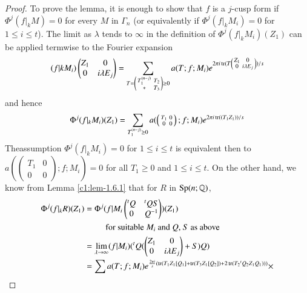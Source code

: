 \begin{proof}
To prove the lemma, it is enough to show that $f$ is a $j$-cusp form
if $\Phi^{j}(f|_{k}M)=0$ for every $M$ in $\Gamma_{n}$ (or
equivalently if $\Phi^{j}(f|_{k}M_{i})=0$ for $1\leq i\leq t$). The
limit as $\lambda$ tends to $\infty$ in the definition of
$\Phi^{j}(f|_{k}M_{i})(Z_{1})$ can be applied termwise to the Fourier
expansion
$$
(f|{k}M_{i})
\begin{pmatrix}
Z_{1} & 0\\
0 & i\lambda E_{j}
\end{pmatrix}
=\sum_{T=\left(\begin{smallmatrix} T_{1}^{(n-j)} & T_{2}\\ \ast &
    T_{3}
  \end{smallmatrix}\right)\geq 0}a(T;f;M_{i})e^{2\pi
  i\operatorname{tr}(T\left(\begin{smallmatrix} Z_{1} & 0\\ 0 & i\lambda E_{j}
  \end{smallmatrix}\right))/s}
$$
and hence
$$
\Phi^{j}(f|_{k}M_{i})(Z_{1})=\sum_{T_{1}^{(n-j)}\geq
  0}a(\left(\begin{smallmatrix} T_{1} & 0\\ 0 & 0
\end{smallmatrix}\right);f;M_{i})e^{2\pi i\operatorname{tr}((T_{1}Z_{1}))/s}
$$
The\pageoriginale assumption $\Phi^{j}(f|_{k}M_{i})=0$ for $1\leq
i\leq t$ is equivalent then to $a(\left(\begin{smallmatrix} T_{1} &
  0\\ 0 & 0\end{smallmatrix}\right);f;M_{i})=0$ for all $T_{1}\geq 0$
  and $1\leq i\leq t$. On the other hand, we know from Lemma
  \ref{c1:lem-1.6.1} that for $R$ in $\operatorname{Sp}(n;\mathbb{Q})$,
\begin{align*}
\Phi^{j}(f|_{k}R)(Z_{1}) &= \Phi^{j}(f|M_{i}
\begin{pmatrix}
{}^{t}Q & {}^{t}QS\\ 
0 & Q^{-1}
\end{pmatrix})
(Z_{1})\\
&\qquad\text{ \ for suitable $M_{i}$ and $Q$, $S$ as above}\\
&= \lim\limits_{\lambda\to \infty}(f|M_{i})({}^{t}Q(
\begin{pmatrix}
Z_{1} & 0\\
0 & i\lambda E_{j}
\end{pmatrix}+S)Q)\\
&= \sum a(T;f;M_{i})e^{\frac{2\pi
    i}{s}(\tr(T_{1}Z_{1}[Q_{1}]+\tr(T_{3}Z_{1}[Q_{2}])+2\tr(T_{2}{}^{t}Q_{2}Z_{1}Q_{1})))}\times\\

\end{align*}
\end{proof}

